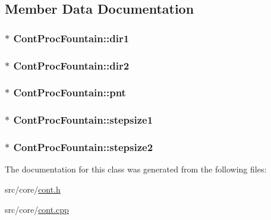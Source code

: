 \subsection{Member Data Documentation}
\hypertarget{a00072_aef7f3257c44eb70b6a6a7cb84ce145b2}{
\subsubsection[{dir1}]{$\ast$ Cont\-Proc\-Fountain\-::dir1\hspace{0.3cm}{\ttfamily [private]}}}\label{a00072_aef7f3257c44eb70b6a6a7cb84ce145b2}
\hypertarget{a00072_ab6177ddc4540a0d5e987b317955e5f2c}{
\subsubsection[{dir2}]{ $\ast$ Cont\-Proc\-Fountain\-::dir2\hspace{0.3cm}{\ttfamily [private]}}}\label{a00072_ab6177ddc4540a0d5e987b317955e5f2c}
\hypertarget{a00072_aa201aa8879ac43945d68aa669aa4a3ff}{
\subsubsection[{pnt}]{$\ast$ Cont\-Proc\-Fountain\-::pnt\hspace{0.3cm}{\ttfamily [private]}}}\label{a00072_aa201aa8879ac43945d68aa669aa4a3ff}
\hypertarget{a00072_aecf7f8806b9d5d8c0ee60df2afe76a56}{
\subsubsection[{stepsize1}]{$\ast$ Cont\-Proc\-Fountain\-::stepsize1\hspace{0.3cm}{\ttfamily [private]}}}\label{a00072_aecf7f8806b9d5d8c0ee60df2afe76a56}
\hypertarget{a00072_a230a7d97b18971908811d5b2f920d4e0}{
\subsubsection[{stepsize2}]{ $\ast$ Cont\-Proc\-Fountain\-::stepsize2\hspace{0.3cm}{\ttfamily [private]}}}\label{a00072_a230a7d97b18971908811d5b2f920d4e0}


The documentation for this class was generated from the following files\-:\begin{DoxyCompactItemize}
\item 
src/core/\hyperlink{a00218}{cont.\-h}\item 
src/core/\hyperlink{a00217}{cont.\-cpp}\end{DoxyCompactItemize}
